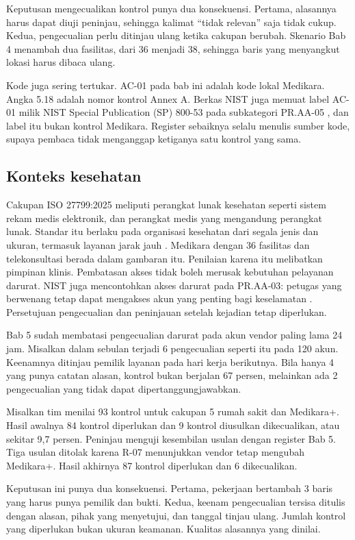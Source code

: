 Keputusan mengecualikan kontrol punya dua konsekuensi. Pertama, alasannya harus dapat diuji
peninjau, sehingga kalimat ``tidak relevan'' saja tidak cukup. Kedua, pengecualian perlu ditinjau
ulang ketika cakupan berubah. Skenario Bab 4 menambah dua fasilitas, dari 36 menjadi 38, sehingga
baris yang menyangkut lokasi harus dibaca ulang.

Kode juga sering tertukar. AC-01 pada bab ini adalah kode lokal Medikara. Angka 5.18 adalah nomor
kontrol Annex A. Berkas NIST juga memuat label AC-01 milik NIST Special Publication (SP) 800-53 pada
subkategori PR.AA-05 \cite{c06-nist-irefs}, dan label itu bukan kontrol Medikara. Register sebaiknya
selalu menulis sumber kode, supaya pembaca tidak menganggap ketiganya satu kontrol yang sama.

\subsection*{Konteks kesehatan}

Cakupan ISO 27799:2025 meliputi perangkat lunak kesehatan seperti sistem rekam medis elektronik, dan
perangkat medis yang mengandung perangkat lunak. Standar itu berlaku pada organisasi kesehatan dari
segala jenis dan ukuran, termasuk layanan jarak jauh \cite{iso27799-2025}. Medikara dengan 36
fasilitas dan telekonsultasi berada dalam gambaran itu. Penilaian karena itu melibatkan pimpinan
klinis. Pembatasan akses tidak boleh merusak kebutuhan pelayanan darurat. NIST juga mencontohkan
akses darurat pada PR.AA-03: petugas yang berwenang tetap dapat mengakses akun yang penting bagi
keselamatan \cite{c06-nist-irefs}. Persetujuan pengecualian dan peninjauan setelah kejadian tetap
diperlukan.

Bab 5 sudah membatasi pengecualian darurat pada akun vendor paling lama 24 jam. Misalkan dalam
sebulan terjadi 6 pengecualian seperti itu pada 120 akun. Keenamnya ditinjau pemilik layanan pada
hari kerja berikutnya. Bila hanya 4 yang punya catatan alasan, kontrol bukan berjalan 67 persen,
melainkan ada 2 pengecualian yang tidak dapat dipertanggungjawabkan.

\begin{kasus}[title={Kasus Medikara Health: Menyusun SoA untuk Cakupan Terbatas}]
Misalkan tim menilai 93 kontrol untuk cakupan 5 rumah sakit dan Medikara+. Hasil awalnya 84 kontrol
diperlukan dan 9 kontrol diusulkan dikecualikan, atau sekitar 9,7 persen. Peninjau menguji kesembilan
usulan dengan register Bab 5. Tiga usulan ditolak karena R-07 menunjukkan vendor tetap mengubah
Medikara+. Hasil akhirnya 87 kontrol diperlukan dan 6 dikecualikan.

Keputusan ini punya dua konsekuensi. Pertama, pekerjaan bertambah 3 baris yang harus punya pemilik
dan bukti. Kedua, keenam pengecualian tersisa ditulis dengan alasan, pihak yang menyetujui, dan
tanggal tinjau ulang. Jumlah kontrol yang diperlukan bukan ukuran keamanan. Kualitas alasannya yang
dinilai.
\end{kasus}

